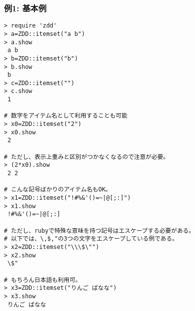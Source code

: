 \subsubsection*{例1: 基本例}



\begin{Verbatim}[baselinestretch=0.7,frame=single]
> require 'zdd'
> a=ZDD::itemset("a b")
> a.show
 a b
> b=ZDD::itemset("b")
> b.show
 b
> c=ZDD::itemset("")
> c.show
 1

# 数字をアイテム名として利用することも可能
> x0=ZDD::itemset("2")
> x0.show
 2

# ただし、表示上重みと区別がつかなくなるので注意が必要。
> (2*x0).show
 2 2

# こんな記号ばかりのアイテム名もOK。
> x1=ZDD::itemset("!#%&'()=~|@[;:]")
> x1.show
 !#%&'()=~|@[;:]

# ただし、rubyで特殊な意味を持つ記号はエスケープする必要がある。
# 以下では、\,$,"の3つの文字をエスケープしている例である。
> x2=ZDD::itemset("\\\$\"")
> x2.show
 \$"

# もちろん日本語も利用可。
> x3=ZDD::itemset("りんご ばなな")
> x3.show
 りんご ばなな
\end{Verbatim}
